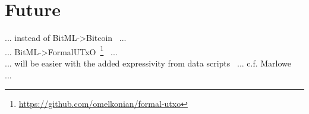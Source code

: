 \documentclass[acmsmall,nonacm=true,screen=true]{acmart}
\newcommand\site[1]{\footnote{\url{#1}}}
\begin{document}
\section{Future}
... instead of BitML->Bitcoin~\cite{bitml} ...\\
... BitML->FormalUTxO~\site{https://github.com/omelkonian/formal-utxo}~\cite{utxo} ...\\
... will be easier with the added expressivity from data scripts~\cite{eutxo} ... c.f. Marlowe~\cite{marlowe} ...\\


\end{document}
